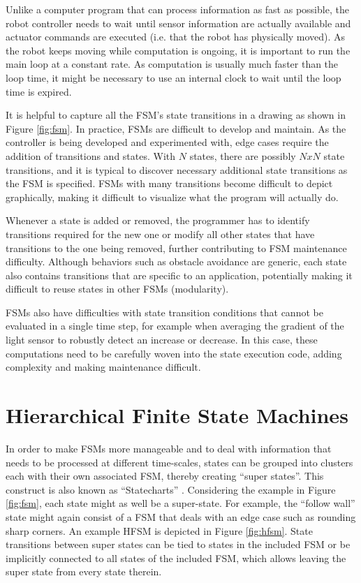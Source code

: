 Unlike a computer program that can process information as fast as possible, the robot controller needs to wait until sensor information are actually available and actuator commands are executed (i.e. that the robot has physically moved). As the robot keeps moving while computation is ongoing, it is important to run the main loop at a constant rate. As computation is usually much faster than the loop time, it might be necessary to use an internal clock to wait until the loop time is expired.



It is helpful to capture all the FSM's state transitions in a drawing as shown in Figure \ref{fig:fsm}. In practice, FSMs are difficult to develop and maintain. As the controller is being developed and experimented with, edge cases require the addition of transitions and states. With $N$ states, there are possibly $NxN$ state transitions, and it is typical to discover necessary additional state transitions as the FSM is specified. FSMs with many transitions become difficult to depict graphically, making it difficult to visualize what the program will actually do. 

Whenever a state is added or removed, the programmer has to identify transitions required for the new one or modify all other states that have transitions to the one being removed, further contributing to FSM maintenance difficulty. Although behaviors such as obstacle avoidance are generic, each state also contains transitions that are specific to an application, potentially making it difficult to reuse states in other FSMs (modularity). 

FSMs also have difficulties with state transition conditions that cannot be evaluated in a single time step, for example when averaging the gradient of the light sensor to robustly detect an increase or decrease. In this case, these computations need to be carefully woven into the state execution code, adding complexity and making maintenance difficult. 


\section{Hierarchical Finite State Machines}\label{sec:stateflow}
In order to make FSMs more manageable and to deal with information that needs to be processed at different time-scales, states can be grouped into clusters each with their own associated FSM, thereby creating ``super states''. This construct is also known as ``Statecharts'' \cite{harel1987statecharts}. Considering the example in Figure \ref{fig:fsm}, each state might as well be a super-state. For example, the ``follow wall'' state might again consist of a FSM that deals with an edge case such as rounding sharp corners. An example HFSM is depicted in Figure \ref{fig:hfsm}. State transitions between super states can be tied to states in the included FSM or be implicitly connected to all states of the included FSM, which allows leaving the super state from every state therein.

